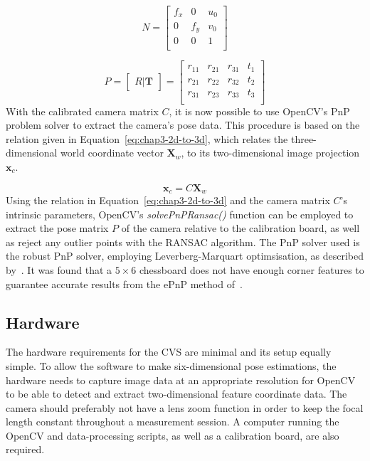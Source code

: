 \begin{equation}
  \label{eq:chap3-cam-intrinsic}
  N = 
  \begin{bmatrix}
    f_x & 0   & u_0 \\
    0   & f_y & v_0 \\
    0   & 0   & 1   \\
  \end{bmatrix}
\end{equation}

\begin{equation}
  \label{eq:chap3-cam-extrinsic}
  P = 
  \begin{bmatrix}
    R | \bm{T}
  \end{bmatrix}
  =
  \begin{bmatrix}
    r_{11} & r_{21} & r_{31} & t_1 \\
    r_{21} & r_{22} & r_{32} & t_2 \\
    r_{31} & r_{23} & r_{33} & t_3 \\
  \end{bmatrix}
\end{equation}
With the calibrated camera matrix $C$, it is now possible to use OpenCV's PnP problem solver to extract the camera's pose data. This procedure is based on the relation given in Equation~\ref{eq:chap3-2d-to-3d}, which relates the three-dimensional world coordinate vector $\bm{X}_w$, to its two-dimensional image projection $\bm{x}_c$.  

\begin{equation}
   \label{eq:chap3-2d-to-3d}
   \bm{x}_c
   = C
   \bm{X}_w
\end{equation}
Using the relation in Equation~\ref{eq:chap3-2d-to-3d} and the camera matrix $C$'s intrinsic parameters, OpenCV's \emph{solvePnPRansac()} function can be employed to extract the pose matrix $P$ of the camera relative to the calibration board, as well as reject any outlier points with the RANSAC algorithm. The PnP solver used is the robust PnP solver, employing Leverberg-Marquart optimsisation, as described by~\cite{schweighofer2006robust}. It was found that a $5\times6$ chessboard does not have enough corner features to guarantee accurate results from the ePnP method of~\cite{lepetit2009epnp}.

\subsection{Hardware}

The hardware requirements for the CVS are minimal and its setup equally simple. To allow the software to make six-dimensional pose estimations, the hardware needs to capture image data at an appropriate resolution for OpenCV to be able to detect and extract two-dimensional feature coordinate data. The camera should preferably not have a lens zoom function in order to keep the focal length constant throughout a measurement session. A computer running the OpenCV and data-processing scripts, as well as a calibration board, are also required. 

